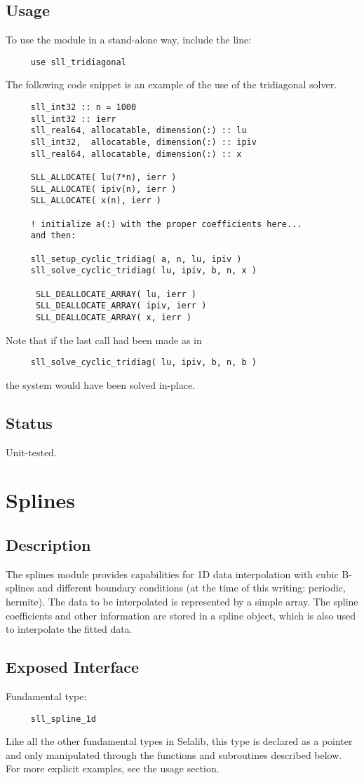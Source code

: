\documentclass[]{report}   %
\begin{document}
\subsection{Usage}
To use the module in a stand-alone way, include the line:
\begin{verbatim}
     use sll_tridiagonal
\end{verbatim}
The following code snippet is an example of the use of the tridiagonal solver.
\begin{verbatim}
     sll_int32 :: n = 1000
     sll_int32 :: ierr
     sll_real64, allocatable, dimension(:) :: lu
     sll_int32,  allocatable, dimension(:) :: ipiv
     sll_real64, allocatable, dimension(:) :: x

     SLL_ALLOCATE( lu(7*n), ierr )
     SLL_ALLOCATE( ipiv(n), ierr )
     SLL_ALLOCATE( x(n), ierr )
     
     ! initialize a(:) with the proper coefficients here... 
     and then:
     
     sll_setup_cyclic_tridiag( a, n, lu, ipiv )
     sll_solve_cyclic_tridiag( lu, ipiv, b, n, x )
     
      SLL_DEALLOCATE_ARRAY( lu, ierr )
      SLL_DEALLOCATE_ARRAY( ipiv, ierr )
      SLL_DEALLOCATE_ARRAY( x, ierr )
\end{verbatim}
Note that if the last call had been made as in
\begin{verbatim}
     sll_solve_cyclic_tridiag( lu, ipiv, b, n, b )
\end{verbatim}
the system would have been solved in-place.

\subsection{Status}
Unit-tested.


\section{Splines}
\subsection{Description}
The splines module provides capabilities for 1D data interpolation with cubic B-splines and different boundary conditions (at the time of this writing: periodic, hermite). The data to be interpolated is represented by a simple array.  The spline coefficients and other information are stored in a spline object, which is also used to interpolate the fitted data.
\subsection{Exposed Interface}
Fundamental type:
\begin{verbatim}
     sll_spline_1d
\end{verbatim}
Like all the other fundamental types in Selalib, this type is declared as a pointer and only manipulated through the functions and subroutines described below. For more explicit examples, see the usage section.
\end{document}
